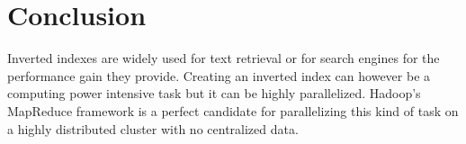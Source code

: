 \documentclass[a4paper,10pt]{article}
\begin{document}
\section{Conclusion}

Inverted indexes are widely used for text retrieval or for search engines for the
performance gain they provide.
Creating an inverted index can however be a computing power intensive task but
it can be highly parallelized.
Hadoop's MapReduce framework is a perfect candidate for parallelizing this kind
of task on a highly distributed cluster with no centralized data.
\end{document}
